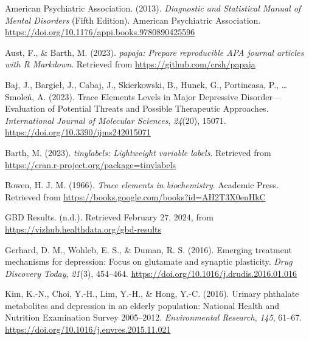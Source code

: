 \documentclass[
  man]{apa6}
\newlength{\cslhangindent}
\newlength{\cslentryspacingunit} %
\newenvironment{CSLReferences}[2] %
 {%
  \setlength{\parindent}{0pt}
  \ifodd #1
  \let\oldpar\par
  \def\par{\hangindent=\cslhangindent\oldpar}
  \fi
  \setlength{\parskip}{#2\cslentryspacingunit}
 }%
 {}
\begin{document}
\begin{CSLReferences}{1}{0}
\leavevmode{}%
American Psychiatric Association. (2013). \emph{Diagnostic and {Statistical Manual} of {Mental Disorders}} (Fifth Edition). {American Psychiatric Association}. \url{https://doi.org/10.1176/appi.books.9780890425596}

\leavevmode{}%
Aust, F., \& Barth, M. (2023). \emph{{papaja}: {Prepare} reproducible {APA} journal articles with {R Markdown}}. Retrieved from \url{https://github.com/crsh/papaja}

\leavevmode{}%
Baj, J., Bargieł, J., Cabaj, J., Skierkowski, B., Hunek, G., Portincasa, P., \ldots{} Smoleń, A. (2023). Trace {Elements Levels} in {Major Depressive Disorder}---{Evaluation} of {Potential Threats} and {Possible Therapeutic Approaches}. \emph{International Journal of Molecular Sciences}, \emph{24}(20), 15071. \url{https://doi.org/10.3390/ijms242015071}

\leavevmode{}%
Barth, M. (2023). \emph{{tinylabels}: Lightweight variable labels}. Retrieved from \url{https://cran.r-project.org/package=tinylabels}

\leavevmode{}%
Bowen, H. J. M. (1966). \emph{Trace elements in biochemistry}. {Academic Press}. Retrieved from \url{https://books.google.com/books?id=AH2T3X0enHkC}

\leavevmode{}%
{GBD Results}. (n.d.). Retrieved February 27, 2024, from \url{https://vizhub.healthdata.org/gbd-results}

\leavevmode{}%
Gerhard, D. M., Wohleb, E. S., \& Duman, R. S. (2016). Emerging treatment mechanisms for depression: Focus on glutamate and synaptic plasticity. \emph{Drug Discovery Today}, \emph{21}(3), 454--464. \url{https://doi.org/10.1016/j.drudis.2016.01.016}

\leavevmode{}%
Kim, K.-N., Choi, Y.-H., Lim, Y.-H., \& Hong, Y.-C. (2016). Urinary phthalate metabolites and depression in an elderly population: {National Health} and {Nutrition Examination Survey} 2005--2012. \emph{Environmental Research}, \emph{145}, 61--67. \url{https://doi.org/10.1016/j.envres.2015.11.021}


\end{CSLReferences}
\end{document}
